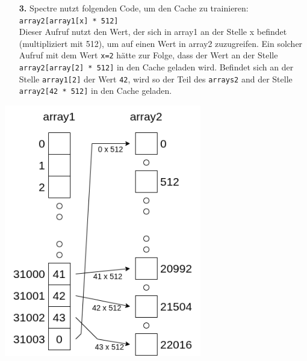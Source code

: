 \noindent
\begin{minipage}{0.58\textwidth}
	\begin{itemize}
		\item[\textbf{3.}] Spectre nutzt folgenden Code, um den Cache zu trainieren: \\
		      \label{itm:spectre_step3_code}
		      \texttt{array2[array1[x] * 512]} \\
		      Dieser Aufruf nutzt den Wert, der sich in array1 an der Stelle x befindet (multipliziert mit 512), um auf einen Wert in array2 zuzugreifen.
		      Ein solcher Aufruf mit dem Wert \texttt{x=2} hätte zur Folge, dass der Wert an der Stelle \texttt{array2[array[2] * 512]} in den Cache geladen wird.
		      Befindet sich an der Stelle \texttt{array1[2]} der Wert \texttt{42}, wird so der Teil des \texttt{arrays2} and der Stelle \texttt{array2[42 * 512]} in den Cache geladen.
	\end{itemize}
\end{minipage}
\hfill
\begin{minipage}{0.4\textwidth}
	\centering
	\includegraphics[width=\linewidth]{Attack}
\end{minipage}

